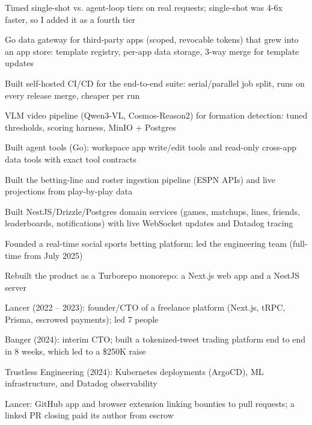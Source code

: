 \documentclass[print]{jack-resume}
\begin{document}
\begin{tightemize}
    \item Timed single-shot vs. agent-loop tiers on real requests; single-shot was 4-6x faster, so I added it as a fourth tier
    \item Go data gateway for third-party apps (scoped, revocable tokens) that grew into an app store: template registry, per-app data storage, 3-way merge for template updates
    \item Built self-hosted CI/CD for the end-to-end suite: serial/parallel job split, runs on every release merge, cheaper per run
    \item VLM video pipeline (Qwen3-VL, Cosmos-Reason2) for formation detection: tuned thresholds, scoring harness, MinIO + Postgres
    \item Built agent tools (Go): workspace app write/edit tools and read-only cross-app data tools with exact tool contracts
\end{tightemize}
\sectionsep

\begin{tightemize}
    \item Built the betting-line and roster ingestion pipeline (ESPN APIs) and live projections from play-by-play data
    \item Built NestJS/Drizzle/Postgres domain services (games, matchups, lines, friends, leaderboards, notifications) with live WebSocket updates and Datadog tracing
    \item Founded a real-time social sports betting platform; led the engineering team (full-time from July 2025)
    \item Rebuilt the product as a Turborepo monorepo: a Next.js web app and a NestJS server
\end{tightemize}
\sectionsep

\begin{tightemize}
    \item Lancer (2022 -- 2023): founder/CTO of a freelance platform (Next.js, tRPC, Prisma, escrowed payments); led 7 people
    \item Banger (2024): interim CTO; built a tokenized-tweet trading platform end to end in 8 weeks, which led to a \$250K raise
    \item Trustless Engineering (2024): Kubernetes deployments (ArgoCD), ML infrastructure, and Datadog observability
    \item Lancer: GitHub app and browser extension linking bounties to pull requests; a linked PR closing paid its author from escrow
\end{tightemize}
\sectionsep
\end{document}

